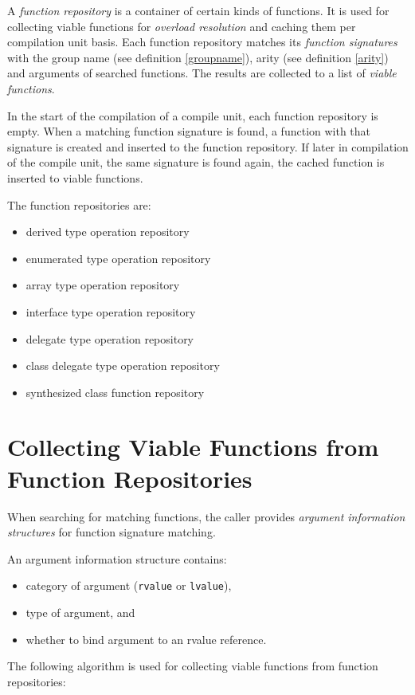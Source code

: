 \documentclass[a4paper,oneside,11pt]{book}
\theoremstyle{definition}
\begin{document}
A \emph{function repository} is a container of certain kinds of functions.
It is used for collecting viable functions for \emph{overload resolution} and caching them per compilation unit basis.
Each function repository matches its \emph{function signatures} with the group name (see definition \ref{groupname}),
arity (see definition \ref{arity}) and arguments of searched functions.
The results are collected to a list of \emph{viable functions}.

In the start of the compilation of a compile unit, each function repository is empty.
When a matching function signature is found, a function with that signature is created and inserted to the function repository.
If later in compilation of the compile unit, the same signature is found again, the cached function is inserted to viable functions.

The function repositories are:

\begin{itemize}
\item
derived type operation repository
\item
enumerated type operation repository
\item
array type operation repository
\item
interface type operation repository
\item
delegate type operation repository
\item
class delegate type operation repository
\item
synthesized class function repository
\end{itemize}

\section{Collecting Viable Functions from Function Repositories}\label{arginfo}

When searching for matching functions, the caller provides \emph{argument information structures} for function signature matching.

An argument information structure contains:
\begin{itemize}
\item
category of argument (\verb|rvalue| or \verb|lvalue|),
\item
type of argument, and
\item
whether to bind argument to an rvalue reference.
\end{itemize}

The following algorithm is used for collecting viable functions from function repositories:
\end{document}

